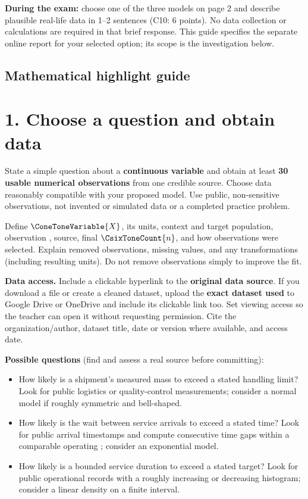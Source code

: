 \textbf{During the exam:} choose one of the three models on page 2 and describe plausible real-life data in 1--2 sentences (C10: 6 points). No data collection or calculations are required in that brief response. This guide specifies the separate online report for your selected option; its scope is the investigation below.


\subsection*{Mathematical highlight guide}
\label{tone:C10:legend}
\section*{1. Choose a question and obtain data}
State a simple question about a \textbf{continuous variable} and obtain at least \textbf{30 usable numerical observations} from one credible source. Choose data reasonably compatible with your proposed model. Use public, non-sensitive observations, not invented or simulated data or a completed practice problem.

Define $\ConeToneVariable{X}$, its units, context and target population, observation , source, final   $\CsixToneCount{n}$, and how observations were selected. Explain removed observations, missing values, and any transformations (including resulting units). Do not remove observations simply to improve the fit.

\textbf{Data access.} Include a clickable hyperlink to the \textbf{original data source}. If you download a file or create a cleaned dataset, upload the \textbf{exact dataset used} to Google Drive or OneDrive and include its clickable link too. Set viewing access so the teacher can open it without requesting permission. Cite the organization/author, dataset title, date or version where available, and access date.

\textbf{Possible questions} (find and assess a real source before committing):
\begin{itemize}
\item How likely is a shipment's measured mass to exceed a stated handling limit? Look for public logistics or quality-control measurements; consider a normal model if roughly symmetric and bell-shaped.
\item How likely is the wait between service arrivals to exceed a stated time? Look for public arrival timestamps and compute consecutive time gaps within a comparable operating ; consider an exponential model.
\item How likely is a bounded service duration to exceed a stated target? Look for public operational records with a roughly increasing or decreasing histogram; consider a linear density on a finite interval.
\end{itemize}

